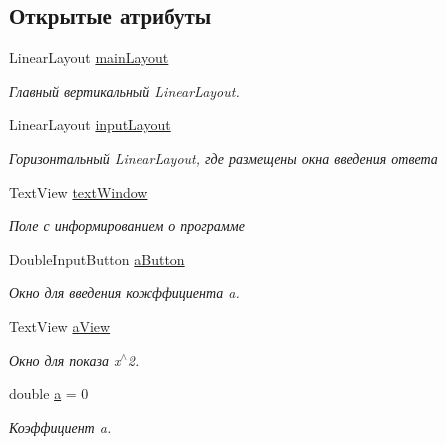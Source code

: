 \subsection*{Открытые атрибуты}
\begin{DoxyCompactItemize}
\item 
LinearLayout \hyperlink{group___u_i_ga22e650d520c660766cd052b6ba1fb74e}{mainLayout}
\begin{DoxyCompactList}\small\item\em Главный вертикальный LinearLayout. \item\end{DoxyCompactList}\item 
LinearLayout \hyperlink{group___u_i_gaf225d99589899b4bef32ce968002032e}{inputLayout}
\begin{DoxyCompactList}\small\item\em Горизонтальный LinearLayout, где размещены окна введения ответа \item\end{DoxyCompactList}\item 
TextView \hyperlink{group___u_i_gae4813ff258c826e4956286e327f16044}{textWindow}
\begin{DoxyCompactList}\small\item\em Поле с информированием о программе \item\end{DoxyCompactList}\item 
DoubleInputButton \hyperlink{group___u_i_gacd00c79fbbbc007e4c15583b9508d2b4}{aButton}
\begin{DoxyCompactList}\small\item\em Окно для введения кожффициента a. \item\end{DoxyCompactList}\item 
TextView \hyperlink{group___u_i_ga7777447806a3220e12c5e41bbda00652}{aView}
\begin{DoxyCompactList}\small\item\em Окно для показа x$^\wedge$2. \item\end{DoxyCompactList}\item 
double \hyperlink{group___u_i_ga4a34577d3eee1be3aa79ae62b4292ee3}{a} = 0
\begin{DoxyCompactList}\small\item\em Коэффициент a. \item\end{DoxyCompactList}\item 

\end{DoxyCompactItemize}
